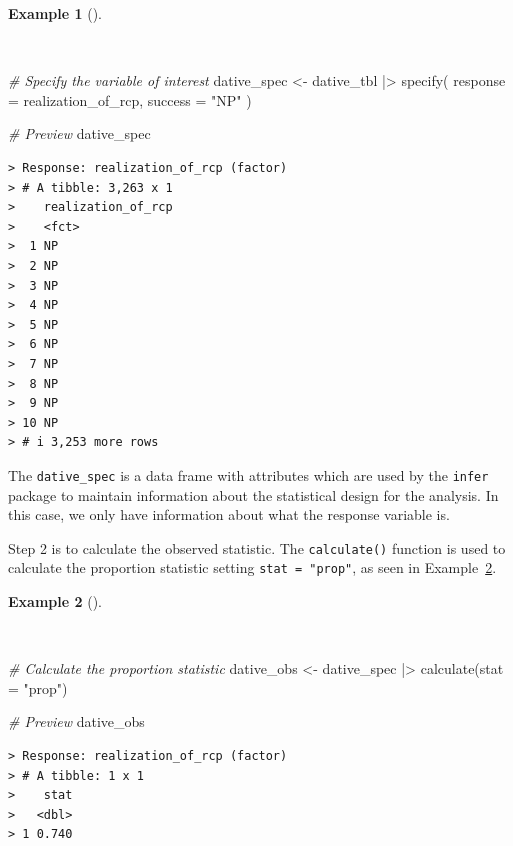 \documentclass[
  letterpaper,
]{latex/krantz}
\newenvironment{Shaded}{\begin{snugshade}}{\end{snugshade}}
\newcommand{\AttributeTok}[1]{\textcolor[rgb]{0.00,0.00,0.00}{#1}}
\newcommand{\CommentTok}[1]{\textcolor[rgb]{0.00,0.00,0.00}{\textit{#1}}}
\newcommand{\FunctionTok}[1]{\textcolor[rgb]{0.00,0.00,0.00}{#1}}
\newcommand{\NormalTok}[1]{\textcolor[rgb]{0.00,0.00,0.00}{#1}}
\newcommand{\OtherTok}[1]{\textcolor[rgb]{0.00,0.00,0.00}{#1}}
\newcommand{\SpecialCharTok}[1]{\textcolor[rgb]{0.00,0.00,0.00}{#1}}
\newcommand{\StringTok}[1]{\textcolor[rgb]{0.00,0.00,0.00}{#1}}
\theoremstyle{definition}
\newtheorem{example}{Example}[chapter]
\theoremstyle{remark}
\begin{document}
\begin{example}[]\protect\hypertarget{exm-ida-cat-specify}{}\label{exm-ida-cat-specify}

~

\begin{Shaded}
\begin{Highlighting}[]
\CommentTok{\# Specify the variable of interest}
\NormalTok{dative\_spec }\OtherTok{\textless{}{-}}
\NormalTok{  dative\_tbl }\SpecialCharTok{|\textgreater{}}
  \FunctionTok{specify}\NormalTok{(}
    \AttributeTok{response =}\NormalTok{ realization\_of\_rcp,}
    \AttributeTok{success =} \StringTok{"NP"}
\NormalTok{  )}

\CommentTok{\# Preview}
\NormalTok{dative\_spec}
\end{Highlighting}
\end{Shaded}

\begin{verbatim}
> Response: realization_of_rcp (factor)
> # A tibble: 3,263 x 1
>    realization_of_rcp
>    <fct>             
>  1 NP                
>  2 NP                
>  3 NP                
>  4 NP                
>  5 NP                
>  6 NP                
>  7 NP                
>  8 NP                
>  9 NP                
> 10 NP                
> # i 3,253 more rows
\end{verbatim}

\end{example}

The \texttt{dative\_spec} is a data frame with attributes which are used
by the \texttt{infer} package to maintain information about the
statistical design for the analysis. In this case, we only have
information about what the response variable is.

Step 2 is to calculate the observed statistic. The \texttt{calculate()}
function is used to calculate the proportion statistic setting
\texttt{stat\ =\ "prop"}, as seen in
Example~\ref{exm-ida-cat-calculate}.

\begin{example}[]\protect\hypertarget{exm-ida-cat-calculate}{}\label{exm-ida-cat-calculate}

~

\begin{Shaded}
\begin{Highlighting}[]
\CommentTok{\# Calculate the proportion statistic}
\NormalTok{dative\_obs }\OtherTok{\textless{}{-}}
\NormalTok{  dative\_spec }\SpecialCharTok{|\textgreater{}}
  \FunctionTok{calculate}\NormalTok{(}\AttributeTok{stat =} \StringTok{"prop"}\NormalTok{)}

\CommentTok{\# Preview}
\NormalTok{dative\_obs}
\end{Highlighting}
\end{Shaded}

\begin{verbatim}
> Response: realization_of_rcp (factor)
> # A tibble: 1 x 1
>    stat
>   <dbl>
> 1 0.740
\end{verbatim}

\end{example}
\end{document}
